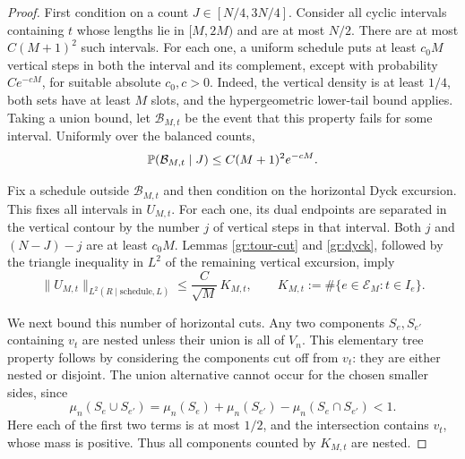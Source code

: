 \begin{proof}
First condition on a count $J\in[N/4,3N/4]$.  Consider all cyclic
intervals containing $t$ whose lengths lie in $[M,2M)$ and are at
most $N/2$.  There are at most $C(M+1)^2$ such intervals.  For each
one, a uniform schedule puts at least $c_0M$ vertical steps in both
the interval and its complement, except with probability
$Ce^{-cM}$, for suitable absolute $c_0,c>0$.  Indeed, the vertical
density is at least $1/4$, both sets have at least $M$ slots, and
the hypergeometric lower-tail bound applies.  Taking a union bound,
let $\mathcal B_{M,t}$ be the event that this property fails for
some interval.  Uniformly over the balanced counts,
\begin{equation}\label{gr:schedule-tail}
 \P(\mathcal B_{M,t}\mid J)
       \leq C(M+1)^2e^{-cM}.
\end{equation}

Fix a schedule outside $\mathcal B_{M,t}$ and then condition on the
horizontal Dyck excursion.  This fixes all intervals in $U_{M,t}$.
For each one, its dual endpoints are separated in the vertical
contour by the number $j$ of vertical steps in that interval.
Both $j$ and $(N-J)-j$ are at least $c_0M$.  Lemmas
\ref{gr:tour-cut} and \ref{gr:dyck}, followed by the triangle
inequality in $L^2$ of the remaining vertical excursion, imply
\begin{equation}\label{gr:vertical-bound}
 \|U_{M,t}\|_{L^2(R\mid\text{schedule},L)}
       \leq\frac{C}{\sqrt M}\,K_{M,t},
 \qquad
 K_{M,t}:=\#\{e\in\mathcal E_M:t\in I_e\}.
\end{equation}

We next bound this number of horizontal cuts.  Any two components
$S_e,S_{e'}$ containing $v_t$ are nested unless their union is all
of $V_n$.  This elementary tree property follows by considering
the components cut off from $v_t$: they are either nested or
disjoint.  The union alternative cannot occur for the chosen
smaller sides, since
\[
 \mu_n(S_e\cup S_{e'})
 =\mu_n(S_e)+\mu_n(S_{e'})-\mu_n(S_e\cap S_{e'})<1.
\]
Here each of the first two terms is at most $1/2$, and the
intersection contains $v_t$, whose mass is positive.
Thus all components counted by $K_{M,t}$ are nested.


\end{proof}
